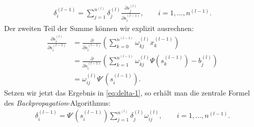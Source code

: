 \begin{align}
    \delta_i^{(l-1)}= \sum\limits_{j=1}^{n^{(l)}} \delta_j^{(l)} \frac{\partial s_j^{(l)}}{\partial s_i^{(l-1)}},
    \qquad i = 1, \dots, n^{(l-1)}. \label{eq:delta-1}
\end{align}
Der zweiten Teil der Summe können wir explizit ausrechnen:
\begin{align*}
    \frac{\partial s_i^{(l)}}{\partial s_i^{(l-1)}}
    &= \frac{\partial}{\partial s_i^{(l-1)}} (\sum\limits_{k=0}^{n^{(l-1)}}\omega_{kj}^{(l)}x_{k}^{(l-1)})\\
    &= \frac{\partial}{\partial s_i^{(l-1)}} (\sum\limits_{k=1}^{n^{(l-1)}}\omega_{kj}^{(l)}\Psi(s_{k}^{(l-1)}) - b_j^{(l)}) \\
    &= \omega_{ij}^{(l)}\Psi'(s_i^{(l-1)}).
\end{align*}
Setzen wir jetzt das Ergebnis in \eqref{eq:delta-1}, so erhält man die zentrale Formel des
\textit{Backpropagation}-Algorithmus:
\begin{align}
    \delta_i^{(l-1)} = \Psi'(s_i^{(l-1)})\sum\limits_{j=1}^{n^{(l)}} \delta_j^{(l)}\omega_{ij}^{(l)},
    \qquad  i = 1, \dots, n^{(l-1)}. \label{eq:delta-final}
\end{align}

